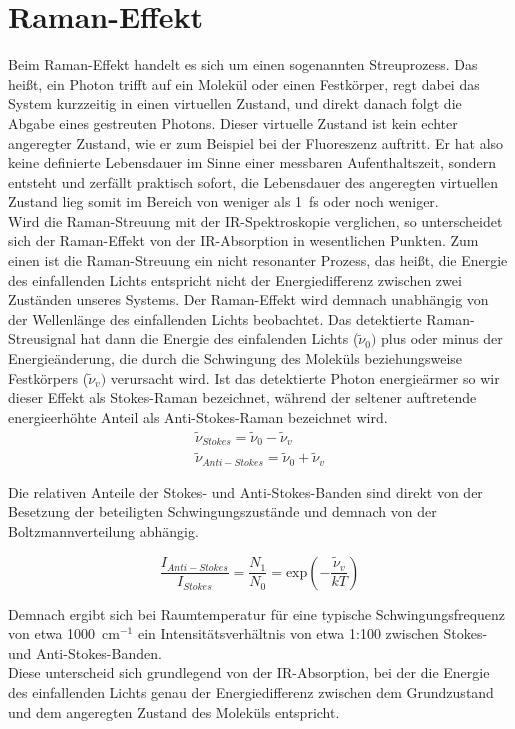 \section{Raman-Effekt}\label{sec:raman}
Beim Raman-Effekt handelt es sich um einen sogenannten Streuprozess. Das heißt, ein Photon trifft auf ein Molekül oder einen Festkörper, regt 
dabei das System kurzzeitig in einen virtuellen Zustand, und direkt danach folgt die Abgabe eines gestreuten Photons. Dieser virtuelle Zustand 
ist kein \glqq{}echter\grqq{} angeregter Zustand, wie er zum Beispiel bei der Fluoreszenz auftritt. Er hat also keine definierte Lebensdauer 
im Sinne einer messbaren Aufenthaltszeit, sondern entsteht und zerfällt praktisch sofort, die Lebensdauer des angeregten virtuellen Zustand 
lieg somit im Bereich von weniger als 1~fs oder noch weniger.\\
Wird die Raman-Streuung mit der IR-Spektroskopie verglichen, so unterscheidet sich der Raman-Effekt von der IR-Absorption in wesentlichen Punkten.
Zum einen ist die Raman-Streuung ein nicht resonanter Prozess, das heißt, die Energie des einfallenden Lichts entspricht nicht der Energiedifferenz zwischen 
zwei Zuständen unseres Systems. Der Raman-Effekt wird demnach unabhängig von der Wellenlänge des einfallenden Lichts beobachtet.
Das detektierte Raman-Streusignal hat dann die Energie des einfalenden Lichts ($\tilde{\nu}_0)$ plus oder minus der Energieänderung, die durch die Schwingung 
des Moleküls beziehungsweise Festkörpers ($\tilde{\nu}_v)$ verursacht wird.
Ist das detektierte Photon energieärmer so wir dieser Effekt als Stokes-Raman bezeichnet, während der seltener auftretende energieerhöhte Anteil als Anti-Stokes-Raman bezeichnet wird.
\begin{eqnarray}
    \tilde{\nu}_{Stokes} = \tilde{\nu}_0 - \tilde{\nu}_v 
    \label{eq:stokes} \\
    \tilde{\nu}_{Anti-Stokes} = \tilde{\nu}_0 + \tilde{\nu}_v
    \label{eq:anti-stokes}  
\end{eqnarray}

Die relativen Anteile der Stokes- und Anti-Stokes-Banden sind direkt von der Besetzung der beteiligten Schwingungszustände und demnach von der Boltzmannverteilung abhängig.

\begin{equation}
    \frac{I_{Anti-Stokes}}{I_{Stokes}} = \frac{N_1}{N_0} = \text{exp}\left(-\frac{\tilde{\nu}_v}{kT}\right)
\end{equation}

Demnach ergibt sich bei Raumtemperatur für eine typische Schwingungsfrequenz von etwa 1000~cm$^{-1}$ ein Intensitätsverhältnis von etwa 1:100 zwischen Stokes- und Anti-Stokes-Banden.\\
Diese unterscheid sich grundlegend von der IR-Absorption, bei der die Energie des einfallenden Lichts genau der Energiedifferenz zwischen dem Grundzustand und dem angeregten Zustand des Moleküls entspricht.

